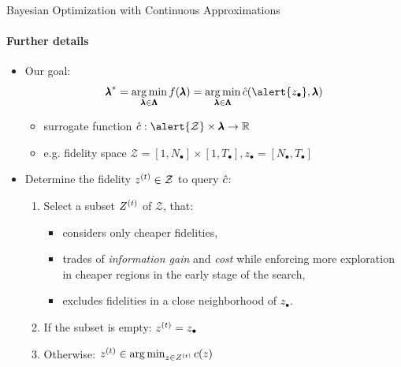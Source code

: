 \begin{frame}[c]{Bayesian Optimization with Continuous Approximations}
\framesubtitle{Further details}

\begin{itemize}

    \item Our goal:
        \begin{equation*}
            \optconf = \argmin_{\conf \in \pcs} \func(\conf) = \argmin_{\conf \in \pcs} \surro(\alert{z_{\bullet}}, \conf)
        \end{equation*}
        \begin{itemize}
            \item surrogate function $\surro : \alert{\mathcal{Z}} \times \conf \rightarrow  \mathbb{R}$
            \item e.g. fidelity space $\mathcal{Z} = [1, N_{\bullet}] \times  [1, T_{\bullet}], z_{\bullet} = [N_{\bullet}, T_{\bullet}]$

        \end{itemize}

    \item Determine the fidelity $\iter[\bocount]{z} \in \mathcal{Z}$ to query $\surro$:
        \begin{enumerate}
            \item Select a subset  $\iter[\bocount]{Z}$ of $\mathcal{Z}$, that:
                \begin{itemize}
                    \item considers only cheaper fidelities,
                    \item trades of \emph{information gain} and \emph{cost} while enforcing more exploration \\ in cheaper regions in the early stage of the search, 
                    \item excludes fidelities in a close neighborhood of $z_{\bullet}$.
                \end{itemize}
            \item If the subset is empty: $\iter[\bocount]{z} = z_{\bullet}$
            \item Otherwise: $\iter[\bocount]{z} \in \argmin_{z \in \iter[\bocount]{Z}} \cost(z)$
        \end{enumerate}

\end{itemize}
\end{frame}

